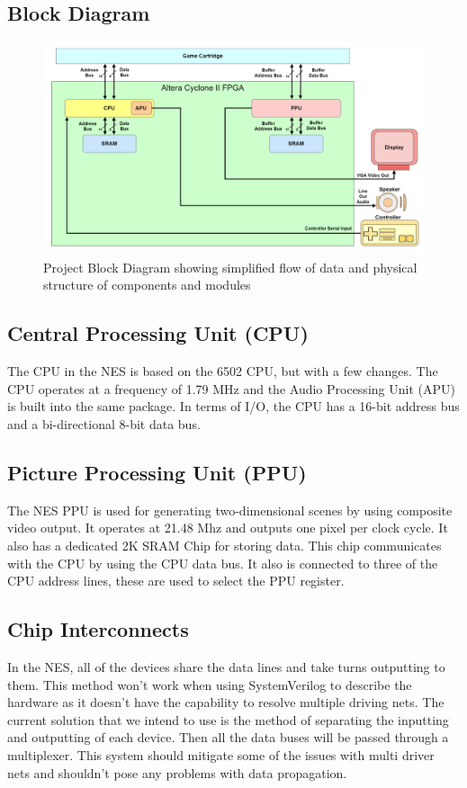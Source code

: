 \documentclass[a4paper]{article}
\begin{document}
\subsection{Block Diagram}
\begin{figure}[H]
\centering
\includegraphics[width=\textwidth]{Capture.PNG}
\caption{\label{fig:Schedule}Project Block Diagram showing simplified flow of data and physical structure of components and modules}
\end{figure}

\subsection{Central Processing Unit (CPU)}
The CPU in the NES is based on the 6502 CPU, but with a few changes. The CPU operates at a frequency of 1.79 MHz and the Audio Processing Unit (APU) is built into the same package. In terms of I/O, the CPU has a 16-bit address bus and a bi-directional 8-bit data bus.

\subsection{Picture Processing Unit (PPU)}
The NES PPU is used for generating two-dimensional scenes by using composite video output. It operates at 21.48 Mhz and outputs one pixel per clock cycle. It also has a dedicated 2K SRAM Chip for storing data. This chip communicates with the CPU by using the CPU data bus. It also is connected to three of the CPU address lines, these are used to select the PPU register.

\subsection{Chip Interconnects}
In the NES, all of the devices share the data lines and take turns outputting to them. This method won't work when using SystemVerilog to describe the hardware as it doesn't have the capability to resolve multiple driving nets. The current solution that we intend to use is the method of separating the inputting and outputting of each device. Then all the data buses will be passed through a multiplexer. This system should mitigate some of the issues with multi driver nets and shouldn't pose any problems with data propagation.
\end{document}
